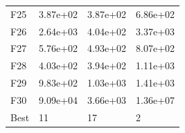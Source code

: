 \begin{table}[H]
\begin{minipage}{.5\linewidth}
\begin{tabular}{llll}
            F25  &  3.87e+02 &  3.87e+02 &  6.86e+02 \\
            F26  &  2.64e+03 &  4.04e+02 &  3.37e+03 \\
            F27  &  5.76e+02 &  4.93e+02 &  8.07e+02 \\
            F28  &  4.03e+02 &  3.94e+02 &  1.11e+03 \\
            F29  &  9.83e+02 &  1.03e+03 &  1.41e+03 \\
            F30  &  9.09e+04 &  3.66e+03 &  1.36e+07 \\
            Best &        11 &        17 &         2 \\
            \bottomrule
            \end{tabular}
            
    \end{minipage} 
\end{table}

